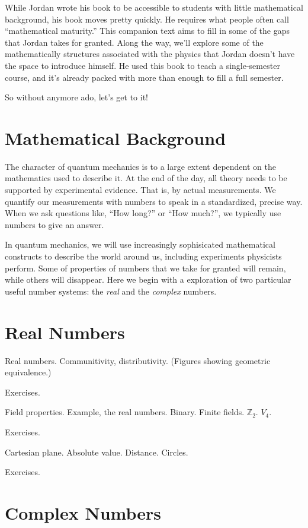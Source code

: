 While Jordan wrote his book to be accessible to students with little mathematical background, his book moves pretty quickly. He requires what people often call ``mathematical maturity.'' This companion text aims to fill in some of the gaps that Jordan takes for granted. Along the way, we'll explore some of the mathematically structures associated with the physics that Jordan doesn't have the space to introduce himself. He used this book to teach a single-semester course, and it's already packed with more than enough to fill a full semester.

So without anymore ado, let's get to it!

\section{Mathematical Background}

The character of quantum mechanics is to a large extent dependent on the mathematics used to describe it. At the end of the day, all theory needs to be supported by experimental evidence. That is, by actual measurements. We quantify our measurements with numbers to speak in a standardized, precise way. When we ask questions like, ``How long?'' or ``How much?'', we typically use numbers to give an answer.

In quantum mechanics, we will use increasingly sophisicated mathematical constructs to describe the world around us, including experiments physicists perform. Some of properties of numbers that we take for granted will remain, while others will disappear. Here we begin with a exploration of two particular useful number systems: the \emph{real} and the \emph{complex} numbers.

\section{Real Numbers}



Real numbers. Communitivity, distributivity. (Figures showing geometric equivalence.)

Exercises.

Field properties. Example, the real numbers. Binary. Finite fields. $\mathbb{Z}_2$. $V_4$.

Exercises.

Cartesian plane. Absolute value. Distance. Circles.

Exercises.

\section{Complex Numbers}

